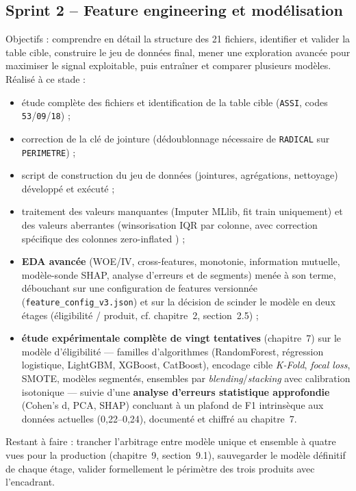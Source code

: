\documentclass[11pt,a4paper]{report}
\begin{document}
\subsection{Sprint 2 -- Feature engineering et modélisation}
Objectifs : comprendre en détail la structure des 21 fichiers, identifier
et valider la table cible, construire le jeu de données final, mener une
exploration avancée pour maximiser le signal exploitable, puis entraîner et
comparer plusieurs modèles. Réalisé à ce stade :
\begin{itemize}
  \item étude complète des fichiers et identification de la table cible
  (\texttt{ASSI}, codes \texttt{53}/\texttt{09}/\texttt{18}) ;
  \item correction de la clé de jointure (dédoublonnage nécessaire de
  \texttt{RADICAL} sur \texttt{PERIMETRE}) ;
  \item script de construction du jeu de données (jointures, agrégations,
  nettoyage) développé et exécuté ;
  \item traitement des valeurs manquantes (Imputer MLlib, fit train
  uniquement) et des valeurs aberrantes (winsorisation IQR par colonne,
  avec correction spécifique des colonnes \og zero-inflated \fg) ;
  \item \textbf{EDA avancée} (WOE/IV, cross-features, monotonie,
  information mutuelle, modèle-sonde SHAP, analyse d'erreurs et de
  segments) menée à son terme, débouchant sur une configuration de
  features versionnée (\texttt{feature\_config\_v3.json}) et sur la
  décision de scinder le modèle en deux étages (éligibilité / produit,
  cf. chapitre~2, section~2.5) ;
  \item \textbf{étude expérimentale complète de vingt tentatives}
  (chapitre~7) sur le modèle d'éligibilité — familles d'algorithmes
  (RandomForest, régression logistique, LightGBM, XGBoost, CatBoost),
  encodage cible \textit{K-Fold}, \textit{focal loss}, SMOTE, modèles
  segmentés, ensembles par \textit{blending}/\textit{stacking} avec
  calibration isotonique — suivie d'une \textbf{analyse d'erreurs
  statistique approfondie} (Cohen's d, PCA, SHAP) concluant à un plafond
  de F1 intrinsèque aux données actuelles (0,22--0,24), documenté et
  chiffré au chapitre~7.
\end{itemize}
Restant à faire : trancher l'arbitrage entre modèle unique et ensemble à
quatre vues pour la production (chapitre~9, section~9.1), sauvegarder le
modèle définitif de chaque étage, valider formellement le périmètre des
trois produits avec l'encadrant.
\end{document}
